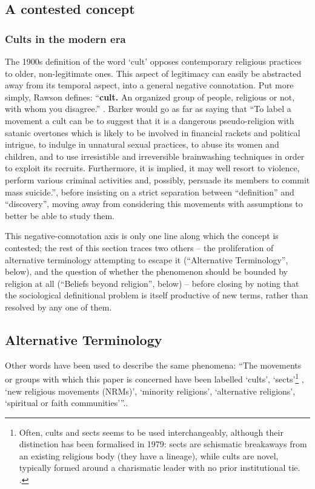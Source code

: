 \subsection{A contested concept}
\subsubsection{Cults in the modern era}
The 1900s definition of the word `cult' opposes contemporary religious practices to older, non-legitimate ones. This aspect of legitimacy can easily be abstracted away from its temporal aspect, into a general negative connotation. Put more simply, Rawson defines: \enquote{\textbf{cult.} An organized group of people, religious or not, with whom you disagree.} \autocite[pp.~106]{rawsonWickedWordsTreasury1989}. Barker would go as far as saying that \enquote{To label a movement a cult can be to suggest that it is a dangerous pseudo-religion with satanic overtones which is likely to be involved in financial rackets and political intrigue, to indulge in unnatural sexual practices, to abuse its women and children, and to use irresistible and irreversible brainwashing techniques in order to exploit its recruits. Furthermore, it is implied, it may well resort to violence, perform various criminal activities and, possibly, persuade its members to commit mass suicide.}, before insisting on a strict separation between \enquote{definition} and \enquote{discovery}, moving away from considering this movements with assumptions to better be able to study them.

This negative-connotation axis is only one line along which the concept is contested; the rest of this section traces two others -- the proliferation of alternative terminology attempting to escape it (\enquote{Alternative Terminology}, below), and the question of whether the phenomenon should be bounded by religion at all (\enquote{Beliefs beyond religion}, below) -- before closing by noting that the sociological definitional problem is itself productive of new terms, rather than resolved by any one of them.

\subsection{Alternative Terminology}
Other words have been used to describe the same phenomena: \enquote{The movements or groups with which this paper is concerned have been labelled `cults', `sects'\footnote{
	Often, cults and sects seems to be used interchangeably, although their distinction has been formalised in 1979: sects are schismatic breakaways from an existing religious body (they have a lineage), while cults are novel, typically formed around a charismatic leader with no prior institutional tie. \autocite[pp.125]{starkChurchesSectsCults1979}.
}
, `new religious movements (NRMs)', `minority religions', `alternative religions', `spiritual or faith communities'}.\autocite[pp.~236]{barkerNotsonewReligiousMovements2014}. 

